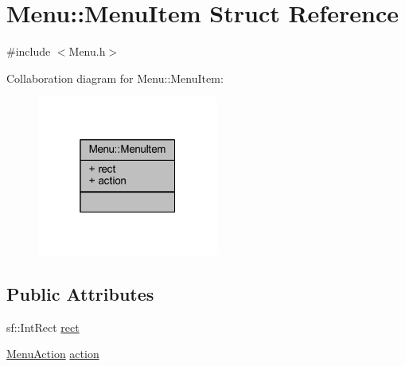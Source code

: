 \hypertarget{struct_menu_1_1_menu_item}{\section{Menu\+:\+:Menu\+Item Struct Reference}
\label{struct_menu_1_1_menu_item}
}


{\ttfamily \#include $<$Menu.\+h$>$}



Collaboration diagram for Menu\+:\+:Menu\+Item\+:
\nopagebreak
\begin{figure}[H]
\begin{center}
\leavevmode
\includegraphics[width=169pt]{struct_menu_1_1_menu_item__coll__graph}
\end{center}
\end{figure}
\subsection*{Public Attributes}
\begin{DoxyCompactItemize}
\item 
sf\+::\+Int\+Rect \hyperlink{struct_menu_1_1_menu_item_ae1998c7b6dad5e12faa131248eb750e3}{rect}
\item 
\hyperlink{class_menu_a2d708ce8df47ab5feaea1ba559a938d3}{Menu\+Action} \hyperlink{struct_menu_1_1_menu_item_a59b62e6cbc3ecae51b46e787b56179f9}{action}
\end{DoxyCompactItemize}


